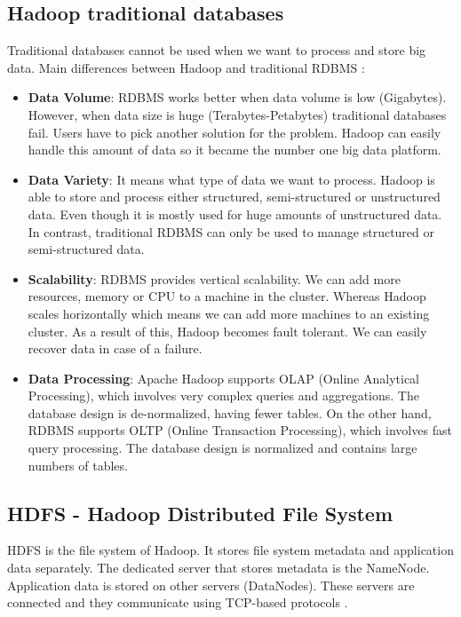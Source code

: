 \subsection{Hadoop \vs traditional databases}
Traditional databases cannot be used when we want to process and store big data. Main differences between Hadoop and traditional RDBMS \cite{Hadoop-vs-RDBMS}:
\begin{itemize}
	\item \textbf{Data Volume}: RDBMS works better when data volume is low (Gigabytes). However, when data size is huge (Terabytes-Petabytes) traditional databases fail. Users have to pick another solution for the problem. Hadoop can easily handle this amount of data so it became the number one big data platform.
	\item \textbf{Data Variety}: It means what type of data we want to process. Hadoop is able to store and process either structured, semi-structured or unstructured data. Even though  it is mostly used for huge amounts of unstructured data. 
	In contrast, traditional RDBMS can only be used to manage structured or semi-structured data. 
	\item \textbf{Scalability}: RDBMS provides vertical scalability. We can add more resources, memory or CPU to a machine in the cluster. Whereas Hadoop scales horizontally which means we can add more machines to an existing cluster. As a result of this, Hadoop becomes fault tolerant. We can easily recover data in case of a failure.
	\item \textbf{Data Processing}: Apache Hadoop supports OLAP (Online Analytical Processing), which involves very complex queries and aggregations. The database design is de-normalized, having fewer tables. On the other hand, RDBMS supports OLTP (Online Transaction Processing), which involves fast query processing. The database design is normalized and contains large numbers of tables.
\end{itemize}
\subsection{HDFS - Hadoop Distributed File System}
HDFS is the file system of Hadoop. It stores file system metadata and application data separately. The dedicated server that stores metadata is the NameNode. Application data is stored on other servers (DataNodes). These servers are connected and they communicate using TCP-based protocols \cite{Shvachko:2010:HDF:1913798.1914427}. 

